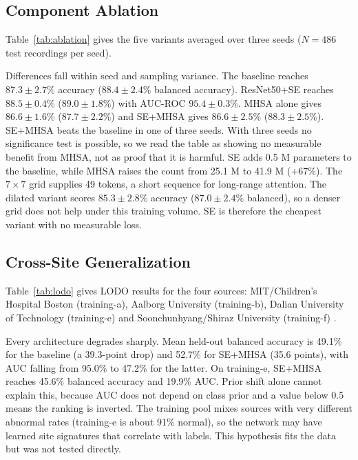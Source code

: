 \documentclass[conference]{IEEEtran}
\begin{document}
\subsection{Component Ablation}
\label{sec:abl}
Table~\ref{tab:ablation} gives the five variants averaged over three seeds ($N=486$ test recordings per seed).



Differences fall within seed and sampling variance. The baseline reaches $87.3 \pm 2.7\%$ accuracy ($88.4 \pm 2.4\%$ balanced accuracy). ResNet50+SE reaches $88.5 \pm 0.4\%$ ($89.0 \pm 1.8\%$) with AUC-ROC $95.4 \pm 0.3\%$. MHSA alone gives $86.6 \pm 1.6\%$ ($87.7 \pm 2.2\%$) and SE+MHSA gives $86.6 \pm 2.5\%$ ($88.3 \pm 2.5\%$). SE+MHSA beats the baseline in one of three seeds. With three seeds no significance test is possible, so we read the table as showing no measurable benefit from MHSA, not as proof that it is harmful. SE adds 0.5 M parameters to the baseline, while MHSA raises the count from 25.1 M to 41.9 M (+67\%). The $7\times7$ grid supplies 49 tokens, a short sequence for long-range attention. The dilated variant scores $85.3 \pm 2.8\%$ accuracy ($87.0 \pm 2.4\%$ balanced), so a denser grid does not help under this training volume. SE is therefore the cheapest variant with no measurable loss.

\subsection{Cross-Site Generalization}
\label{sec:lodo}
Table~\ref{tab:lodo} gives LODO results for the four sources: MIT/Children's Hospital Boston (training-a), Aalborg University (training-b), Dalian University of Technology (training-e) and Soonchunhyang/Shiraz University (training-f) \cite{liu}.



Every architecture degrades sharply. Mean held-out balanced accuracy is 49.1\% for the baseline (a 39.3-point drop) and 52.7\% for SE+MHSA (35.6 points), with AUC falling from 95.0\% to 47.2\% for the latter. On training-e, SE+MHSA reaches 45.6\% balanced accuracy and 19.9\% AUC. Prior shift alone cannot explain this, because AUC does not depend on class prior and a value below 0.5 means the ranking is inverted. The training pool mixes sources with very different abnormal rates (training-e is about 91\% normal), so the network may have learned site signatures that correlate with labels. This hypothesis fits the data but was not tested directly.
\end{document}
